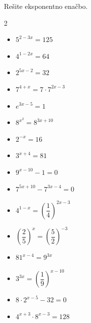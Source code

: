     \begin{naloga}
        Rešite eksponentno enačbo.
        \begin{multicols}{2}
            
        \begin{itemize}
            \item $5^{2-3x}=125$
            \item $4^{1-2x}=64$
            \item $2^{5x-2}=32$
            \item $7^{4+x}=7\cdot 7^{2x-3}$
            \item $e^{3x-5}=1$
            \item $8^{x^2}=8^{3x+10}$
            \item $2^{-x}=16$
            \item $3^{x+4}=81$
            \item $9^{x-10}-1=0$
            \item $7^{5x+10}-7^{3x-4}=0$
            \item $4^{1-x}=\left(\dfrac{1}{4}\right)^{2x-3}$
            \item $\left(\dfrac{2}{5}\right)^x=\left(\dfrac{5}{2}\right)^{-3}$
            \item $81^{x-4}=9^{3x}$
            \item $3^{3x}=\left(\dfrac{1}{9}\right)^{x-10}$
            \item $8\cdot 2^{x-5}-32=0$
            \item $4^{x+3}\cdot 8^{x-3}=128$
        \end{itemize}
        \end{multicols}

    \end{naloga}


